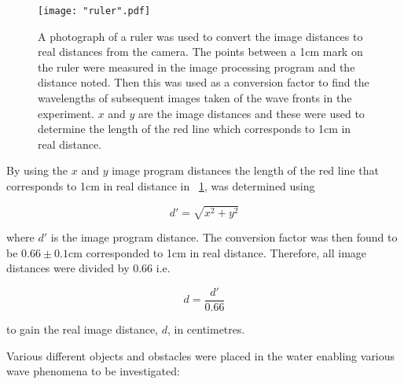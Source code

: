 \documentclass{article}
\newcommand{\figref}[2][\figurename~]{#1\ref{#2}}
\begin{document}
\begin{figure}[h]
\centering
\texttt{[image: "ruler".pdf]}
\caption{A photograph of a ruler was used to convert the image distances to real distances from the camera. The points between a 1cm mark on the ruler were measured in the image processing program and the distance noted. Then this was used as a conversion factor to find the wavelengths of subsequent images taken of the wave fronts in the experiment. $x$ and $y$ are the image distances and these were used to determine the length of the red line which corresponds to 1cm in real distance.}
\label{fig:ruler}
\end{figure}

\vspace{2mm}
\noindent
By using the $x$ and $y$ image program distances the length of the red line that corresponds to 1cm in real distance in \figref{fig:ruler}, was determined using 

\vspace{2mm}
\noindent
\begin{equation}
\label{eq:pythagoras}
d' = \sqrt{x^2 + y^2}
\end{equation}

\vspace{2mm}
\noindent
where $d'$ is the image program distance. The conversion factor was then found to be $0.66 \pm 0.1$cm corresponded to 1cm in real distance. Therefore, all image distances were divided by 0.66 i.e. 

\vspace{2mm}
\noindent
\begin{equation}
\label{eq:conversion}
d = \frac{d'}{0.66}
\end{equation}

\vspace{2mm}
\noindent
to gain the real image distance, $d$, in centimetres.

\vspace{2mm}
\noindent
Various different objects and obstacles were placed in the water enabling various wave phenomena to be investigated:
\end{document}
